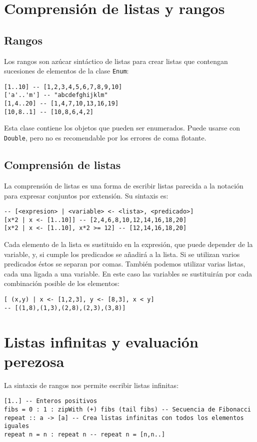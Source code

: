 \section{Comprensión de listas y rangos}
\subsection{Rangos}
Los rangos son azúcar sintáctico de listas para crear listas que contengan sucesiones de elementos
de la clase \texttt{Enum}:

\begin{lstlisting}
[1..10] -- [1,2,3,4,5,6,7,8,9,10]
['a'..'m'] -- "abcdefghijklm"
[1,4..20] -- [1,4,7,10,13,16,19]
[10,8..1] -- [10,8,6,4,2]
\end{lstlisting}

Esta clase contiene los objetos que pueden ser enumerados. Puede usarse con \texttt{Double}, pero
no es recomendable por los errores de coma flotante.

\subsection{Comprensión de listas}
La comprensión de listas es una forma de escribir listas parecida a la notación para
expresar conjuntos por extensión. Su sintaxis es:
\begin{lstlisting}
-- [<expresion> | <variable> <- <lista>, <predicado>]
[x*2 | x <- [1..10]] -- [2,4,6,8,10,12,14,16,18,20]
[x*2 | x <- [1..10], x*2 >= 12] -- [12,14,16,18,20]
\end{lstlisting}

Cada elemento de la lista es sustituido en la expresión, que puede depender de la variable, y, si
cumple los predicados se añadirá a la lista. Si se utilizan varios predicados éstos se separan por
comas. También podemos utilizar varias listas, cada una ligada a una variable. En este caso las
variables se sustituirán por cada combinación posible de los elementos:
\begin{lstlisting}
[ (x,y) | x <- [1,2,3], y <- [8,3], x < y]
-- [(1,8),(1,3),(2,8),(2,3),(3,8)]
\end{lstlisting}

\section{Listas infinitas y evaluación perezosa}
La sintaxis de rangos nos permite escribir listas infinitas:

\begin{lstlisting}
[1..] -- Enteros positivos
fibs = 0 : 1 : zipWith (+) fibs (tail fibs) -- Secuencia de Fibonacci
repeat :: a -> [a] -- Crea listas infinitas con todos los elementos iguales
repeat n = n : repeat n -- repeat n = [n,n..]
\end{lstlisting}

